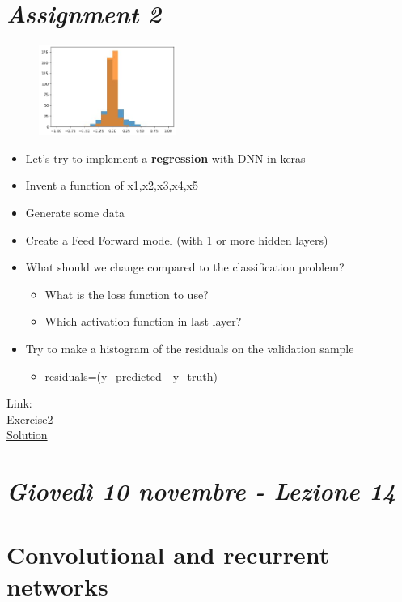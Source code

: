 \section{\textit{Assignment 2}}
\begin{figure}
	\includegraphics[width=0.4\textwidth]{figure_ml/ass2.png}
\end{figure} 
\quad
\begin{itemize}
	\item Let’s try to implement a \textbf{regression} with DNN in keras
	\item Invent a function of x1,x2,x3,x4,x5
	\item Generate some data
	\item Create a Feed Forward model (with 1 or more hidden layers)
	\item What should we change compared to the classification problem?
	\begin{itemize}
		\item What is the loss function to use?
		\item Which activation function in last layer?
	\end{itemize}
	\item Try to make a histogram of the residuals on the validation sample
	\begin{itemize}
		\item residuals=(y\_predicted - y\_truth)
	\end{itemize}
\end{itemize}

Link: \\
\href{https://colab.research.google.com/drive/131B2QwLAm1Ct7e5KdYgRPLIBHGUY05j5?usp=sharing}{Exercise2}\\
\href{https://colab.research.google.com/drive/1_J3EO4IpDoYk1BKIQcxxazxmKqCmLfGJ?usp=sharing}{Solution}

\newpage
\section{\textit{Giovedì 10 novembre - Lezione 14}}

\section{Convolutional and recurrent networks}

